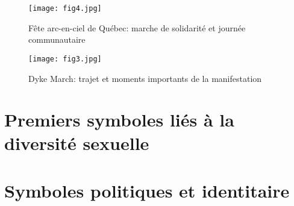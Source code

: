 \begin{figure}[ht]
	\centering
	\texttt{[image: fig4.jpg]}
	\caption{Fête arc-en-ciel de Québec: marche de solidarité et journée
    communautaire}
	\label{fig:figure4}
\end{figure}

\begin{figure}[ht]
	\centering
	\texttt{[image: fig3.jpg]}
	\caption[]{Dyke March: trajet et moments importants de la manifestation}
	\label{fig:figure3}
\end{figure}


\section{Premiers symboles liés à la diversité sexuelle}
\label{sec:premiers_symboles_li_s_la_diversit_sexuelle}


\section{Symboles politiques et identitaire}
\label{sec:symboles_politiques_et_identitaire}


